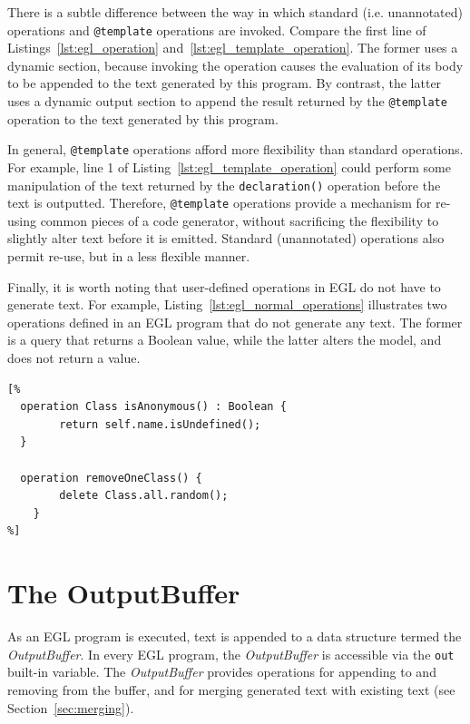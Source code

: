 There is a subtle difference between the way in which standard (i.e. unannotated)
operations and \texttt{@template} operations are invoked. Compare the first line of Listings~\ref{lst:egl_operation} and~\ref{lst:egl_template_operation}. The former
uses a dynamic section, because invoking the operation causes the evaluation of 
its body to be appended to the text generated by this program. By contrast, the 
latter uses a dynamic output section to append the result returned by 
the \texttt{@template} operation to the text generated by this program.

In general, \texttt{@template} operations afford more flexibility than standard
operations. For example, line 1 of Listing~\ref{lst:egl_template_operation} could
perform some manipulation of the text returned by the \texttt{declaration()} operation
before the text is outputted. Therefore, \texttt{@template} operations provide
a mechanism for re-using common pieces of a code generator, without sacrificing the
flexibility to slightly alter text before it is emitted. Standard (unannotated) 
operations also permit re-use, but in a less flexible manner.

Finally, it is worth noting that user-defined operations in EGL do not have to 
generate text. For example, Listing~\ref{lst:egl_normal_operations} 
illustrates two operations defined in an EGL program that do not generate any text.
The former is a query that returns a Boolean value, while the latter alters the model,
and does not return a value.

\begin{lstlisting}[float=tbp, caption=Operations that do not generate any text., label=lst:egl_normal_operations, language=EGL]
[%
  operation Class isAnonymous() : Boolean {
		return self.name.isUndefined();
  }

  operation removeOneClass() {
		delete Class.all.random();
	}
%]
\end{lstlisting}

\section{The OutputBuffer}
As an EGL program is executed, text is appended to a data structure termed 
the \emph{OutputBuffer}. In every EGL program, the \emph{OutputBuffer} is 
accessible via the \texttt{out} built-in variable. The \emph{OutputBuffer} 
provides operations for appending to and removing from the buffer, and for 
merging generated text with existing text (see Section~\ref{sec:merging}).

